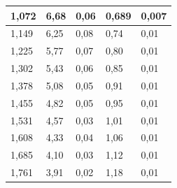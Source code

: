 \documentclass[10pt,a4paper]{article}
\begin{document}
\begin{table}[h]
{\begin{tabular}{|l|l|l|l|l|}
            1,072                                     & 6,68                               & 0,06                       & 0,689                                             & 0,007                                 \\ \hline
            1,149                                     & 6,25                               & 0,08                       & 0,74                                              & 0,01                                  \\ \hline
            1,225                                     & 5,77                               & 0,07                       & 0,80                                              & 0,01                                  \\ \hline
            1,302                                     & 5,43                               & 0,06                       & 0,85                                              & 0,01                                  \\ \hline
            1,378                                     & 5,08                               & 0,05                       & 0,91                                              & 0,01                                  \\ \hline
            1,455                                     & 4,82                               & 0,05                       & 0,95                                              & 0,01                                  \\ \hline
            1,531                                     & 4,57                               & 0,03                       & 1,01                                              & 0,01                                  \\ \hline
            1,608                                     & 4,33                               & 0,04                       & 1,06                                              & 0,01                                  \\ \hline
            1,685                                     & 4,10                               & 0,03                       & 1,12                                              & 0,01                                  \\ \hline
            1,761                                     & 3,91                               & 0,02                       & 1,18                                              & 0,01                                  \\ \hline

\end{tabular}}
\end{table}
\end{document}
